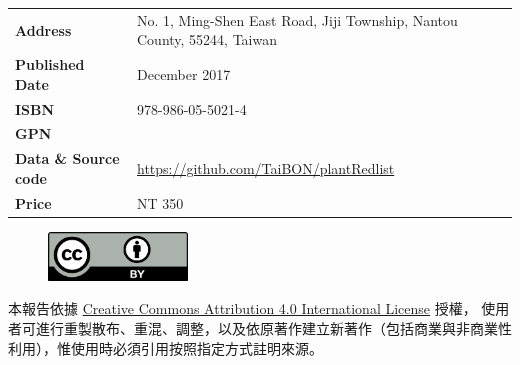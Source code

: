 \begin{table}[H]
{\begin{tabular}{>{\raggedright\arraybackslash}p{3cm}p{8cm}}
      \textbf{Address}            & No. 1, Ming-Shen East Road, Jiji Township, Nantou County, 55244, Taiwan \\
      \textbf{Published Date}     & December 2017 \\
      \textbf{ISBN}              & 978-986-05-5021-4 \\
      \textbf{GPN}               & \\
      \textbf{Data \& Source code} & \href{https://github.com/TaiBON/plantRedlist}{https://github.com/TaiBON/plantRedlist} \\
      \textbf{Price}              & NT 350 \\
  \end{tabular}
  }
\end{table}

\begin{figure}[H]
    \includegraphics[width=10em]{images/ccby40.png}
\end{figure}
\tiny \noindent 本報告依據 \href{https://creativecommons.org/licenses/by/4.0}{Creative Commons Attribution 4.0 International License} 授權，
使用者可進行重製散布、重混、調整，以及依原著作建立新著作（包括商業與非商業性利用），惟使用時必須引用按照指定方式註明來源。\\
